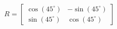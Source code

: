 \documentclass[preview]{standalone}
\begin{document}
\begin{align*}
R = \begin{bmatrix} \cos(45^\circ) & -\sin(45^\circ) \\ \sin(45^\circ) & \cos(45^\circ) \end{bmatrix}
\end{align*}
\end{document}
